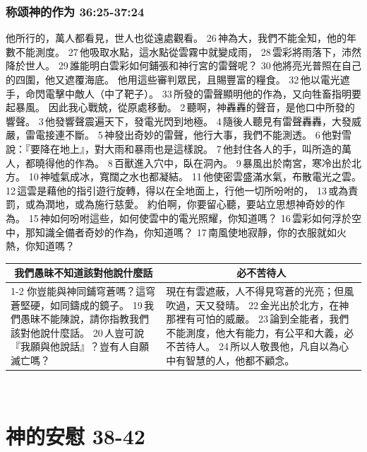 \subsubsection{称颂神的作为 36:25-37:24}
他所行的，萬人都看見，世人也從遠處觀看。 26 神為大，我們不能全知，他的年數不能測度。 27 他吸取水點，這水點從雲霧中就變成雨， 28 雲彩將雨落下，沛然降於世人。 29 誰能明白雲彩如何鋪張和神行宮的雷聲呢？ 30 他將亮光普照在自己的四圍，他又遮覆海底。
他用這些審判眾民，且賜豐富的糧食。 32 他以電光遮手，命閃電擊中敵人（中了靶子）。 33 所發的雷聲顯明他的作為，又向牲畜指明要起暴風。
因此我心戰兢，從原處移動。 2 聽啊，神轟轟的聲音，是他口中所發的響聲。 3 他發響聲震遍天下，發電光閃到地極。 4 隨後人聽見有雷聲轟轟，大發威嚴，雷電接連不斷。 5 神發出奇妙的雷聲，他行大事，我們不能測透。 6 他對雪說：『要降在地上』，對大雨和暴雨也是這樣說。 7 他封住各人的手，叫所造的萬人，都曉得他的作為。 8 百獸進入穴中，臥在洞內。 9 暴風出於南宮，寒冷出於北方。 10 神噓氣成冰，寬闊之水也都凝結。 11 他使密雲盛滿水氣，布散電光之雲。 12 這雲是藉他的指引遊行旋轉，得以在全地面上，行他一切所吩咐的， 13 或為責罰，或為潤地，或為施行慈愛。
約伯啊，你要留心聽，要站立思想神奇妙的作為。 15 神如何吩咐這些，如何使雲中的電光照耀，你知道嗎？ 16 雲彩如何浮於空中，那知識全備者奇妙的作為，你知道嗎？ 17 南風使地寂靜，你的衣服就如火熱，你知道嗎？
\begin{table}[H]
\centering
\begin{tabular}{p{7.15cm}|p{9.7500cm}}\hline\hline
\multicolumn{1}{c|}{我們愚昧不知道該對他說什麼話}&\multicolumn{1}{c}{必不苦待人}\\\cline{1-2}
你豈能與神同鋪穹蒼嗎？這穹蒼堅硬，如同鑄成的鏡子。 19 我們愚昧不能陳說，請你指教我們該對他說什麼話。 20 人豈可說『我願與他說話』？豈有人自願滅亡嗎？
&現在有雲遮蔽，人不得見穹蒼的光亮；但風吹過，天又發晴。 22 金光出於北方，在神那裡有可怕的威嚴。 23 論到全能者，我們不能測度，他大有能力，有公平和大義，必不苦待人。 24 所以人敬畏他，凡自以為心中有智慧的人，他都不顧念。\\\hline
\end{tabular}
\end{table} 


\section{神的安慰 38-42}
